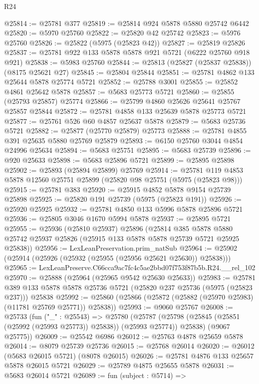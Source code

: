 \begin{lexlean}{R24}
\begin{coremodule}
@25814 := @25781 @377
@25819 := @25814 @924 @5878 @5880 @25742 @6442
@25820 := @5970 @25760
@25822 := @25820 @42 @25742
@25823 := @5976 @25760
@25826 := @25822 (@5975 (@25823 @42))
@25827 := @25819 @25826
@25837 := @25781 @922 @133 @5878 @5878 @921 @5721 (@6222 @25760 @918 @921)
@25838 := @5983 @25760
@25844 := @25813 (@25827 (@25837 @25838)) (@8175 @25621 @27)
@25845 := @25804 @25844
@25851 := @25781 @4862 @133 @25644 @5878 @25774 @5721
@25852 := @25788 @3001
@25855 := @25852 @4861 @25642 @5878
@25857 := @5683 @25773 @5721
@25860 := @25855 (@25793 @25857) @25774
@25866 := @25799 @4860 @25626 @25641 @25767 @25857 @25844
@25872 := @25781 @4858 @133 @25639 @5878 @25773 @5721
@25877 := @25761 @526 @60 @4857 @25637 @5878
@25879 := @5683 @25736 @5721
@25882 := @25877 (@25770 @25879) @25773
@25888 := @25781 @4855 @391 @25635 @5880 @25769 @25879
@25893 := @6150 @25760 @3044 @4854 @24996 @25634
@25894 := @5683 @25751
@25895 := @5683 @25739
@25896 := @920 @25633
@25898 := @5683 @25896 @5721
@25899 := @25895 @25898
@25902 := @25893 (@25894 @25899) @25769
@25914 := @25781 @119 @4853 @5878 @12560 @25751 @25899 (@25820 @98 @25751 (@5975 (@25823 @98)))
@25915 := @25781 @383
@25920 := @25915 @4852 @5878 @9154 @25739 @25898
@25925 := @25820 @191 @25739 (@5975 (@25823 @191))
@25926 := @25920 @25925
@25932 := @25781 @4850 @133 @5996 @5878 @25896 @5721
@25936 := @25805 @3046 @1670 @5994 @5878
@25937 := @25895 @5721
@25955 := @25936
    (@25810 @25937)
    @25896
    (@25814
      @385
      @5878
      @5880
      @25742
      @25937
      @25826
      (@25915 @133 @5878 @5878 @25739 @5721 @25925 @25838))
@25956 := LexLeanPreservation.prim_natSub
@25964 := @25902 (@25914 (@25926 (@25932 (@25955 (@25956 @25621 @25630)) @25838)))
@25965 := LexLeanPreserve.C66cca9ac7fc4c5ae2bbd07f753f87b5b.R24.__rel_102
@25970 := @25888 (@25964 (@25965 @9542 @25630 @25633))
@25983 := @25781
    @389
    @133
    @5878
    @5878
    @25736
    @5721
    (@25820 @237 @25736 (@5975 (@25823 @237)))
    @25838
@25992 := @25860 (@25866 (@25872 (@25882 (@25970 @25983) (@11781 @25769 @25771)) @25838))
@25993 := @9060 @25767
@26008 := @25733
    (fun ("_" : @25543) =>
    @25780
      (@25787 (@25798 (@25845 (@25851 (@25992 (@25993 @25773)) @25838)) (@25993 @25774)) @25838)
      (@9067 @25775))
@26009 := @25542 @6986
@26012 := @25763 @4878 @25659 @5878
@26014 := @8079 @25739 @25736
@26015 := @25768 @26014
@26020 := @26012 (@5683 @26015 @5721) (@8078 @26015)
@26026 := @25781 @4876 @133 @25657 @5878 @26015 @5721
@26029 := @25789 @4875 @25655 @5878
@26031 := @5683 @26014 @5721
@26089 := fun (subject : @5714) =>

\end{coremodule}
\end{lexlean}
